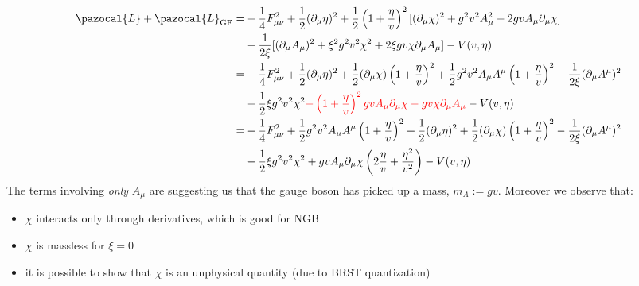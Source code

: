 \documentclass[../main.tex]{subfiles}
\begin{document}
\begin{align*}
\pazocal{L}+\pazocal{L}_{\text{GF}}=&-\frac{1}{4}F_{\mu\nu}^2+\frac{1}{2}(\partial_\mu\eta)^2+\frac{1}{2}\left(1+\frac{\eta}{v}\right)^2[(\partial_\mu\chi)^2+g^2v^2A_\mu^2-2gvA_\mu\partial_\mu\chi]\\
&-\frac{1}{2\xi}[(\partial_\mu A_\mu)^2+\xi^2g^2v^2\chi^2+2\xi gv\chi\partial_\mu A_\mu]-V(v,\eta)\\
=&-\frac{1}{4}F_{\mu\nu}^2+\frac{1}{2}(\partial_\mu\eta)^2+\frac{1}{2}(\partial_\mu\chi)\left(1+\frac{\eta}{v}\right)^2+\frac{1}{2}g^2v^2A_\mu A^\mu\left(1+\frac{\eta}{v}\right)^2-\frac{1}{2\xi}(\partial_\mu A^\mu)^2\\
&-\frac{1}{2}\xi g^2v^2\chi^2{\color{red}-\left(1+\frac{\eta}{v}\right)^2gvA_\mu\partial_\mu\chi-gv\chi\partial_\mu A_\mu}-V(v,\eta)\\
=&-\frac{1}{4}F_{\mu\nu}^2+\frac{1}{2}g^2v^2A_\mu A^\mu\left(1+\frac{\eta}{v}\right)^2+\frac{1}{2}(\partial_\mu\eta)^2+\frac{1}{2}(\partial_\mu\chi)\left(1+\frac{\eta}{v}\right)^2-\frac{1}{2\xi}(\partial_\mu A^\mu)^2\\
&-\frac{1}{2}\xi g^2v^2\chi^2+gvA_\mu\partial_\mu\chi\left(2\frac{\eta}{v}+\frac{\eta^2}{v^2}\right)-V(v,\eta)
\end{align*}
The terms involving \textit{only} $A_\mu$ are suggesting us that the gauge boson has picked up a mass, $m_A:=gv$. Moreover we observe that:
\begin{itemize}
    \item $\chi$ interacts only through derivatives, which is good for NGB 
    \item $\chi$ is massless for $\xi=0$
    \item it is possible to show that $\chi$ is an unphysical quantity (due to BRST quantization)
\end{itemize}
\end{document}
